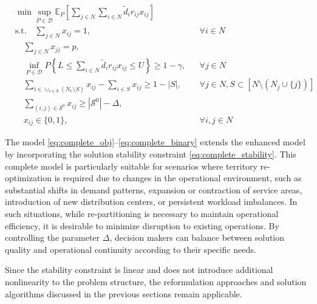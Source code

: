 \documentclass[preprint,12pt,authoryear]{elsarticle}
\begin{document}
\begin{align}
&\min \sup_{P \in \mathcal{D}} \mathbb{E}_P\left[\sum_{j \in N} \sum_{i \in N} \widetilde{d}_i r_{ij} x_{ij}\right] \label{eq:complete_obj} \\
&\text{s.t.} \quad \sum_{j \in N} x_{ij} = 1, && \forall i \in N \label{eq:complete_assign} \\
&\quad \sum_{j \in N} x_{jj} = p, \label{eq:complete_districts} \\
&\quad \inf_{P \in \mathcal{D}} P\left\{ L \leqslant \sum_{i \in N} \widetilde{d}_i r_{ij} x_{ij} \leqslant U \right\} \geqslant 1 - \gamma, && \forall j \in N \label{eq:complete_balance} \\
&\quad \sum_{i \in \cup_{v\in S}(N_v\setminus S)} x_{ij} - \sum_{i \in S} x_{ij} \geqslant 1 - |S|, && \forall j \in N, S \subset [N \setminus (N_j \cup \{j\})] \label{eq:complete_connectivity} \\
&\quad \sum_{(i,j) \in \mathcal{S}^0} x_{ij} \geqslant |\mathcal{S}^0| - \Delta, \label{eq:complete_stability} \\
&\quad x_{ij} \in \{0,1\}, && \forall i,j \in N \label{eq:complete_binary}
\end{align}

The model \eqref{eq:complete_obj}--\eqref{eq:complete_binary} extends the enhanced model by incorporating the solution stability constraint \eqref{eq:complete_stability}. This complete model is particularly suitable for scenarios where territory re-optimization is required due to changes in the operational environment, such as substantial shifts in demand patterns, expansion or contraction of service areas, introduction of new distribution centers, or persistent workload imbalances. In such situations, while re-partitioning is necessary to maintain operational efficiency, it is desirable to minimize disruption to existing operations. By controlling the parameter $\Delta$, decision makers can balance between solution quality and operational continuity according to their specific needs.

Since the stability constraint is linear and does not introduce additional nonlinearity to the problem structure, the reformulation approaches and solution algorithms discussed in the previous sections remain applicable.
\end{document}
